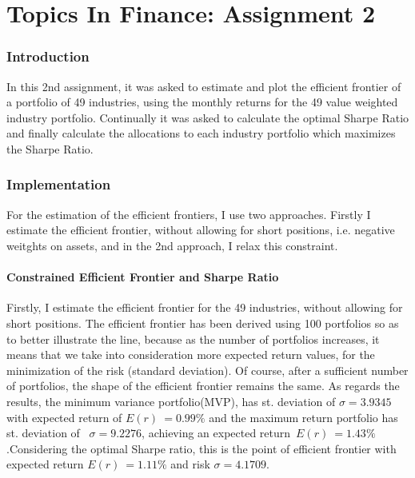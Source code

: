 \documentclass{article}
\begin{document}
\part{Topics In Finance: Assignment 2}

\bigskip

\section{Introduction}

In this 2nd assignment, it was asked to estimate and plot the efficient
frontier of a portfolio of 49 industries, using the monthly returns for the
49 value weighted industry portfolio. Continually it was asked to calculate
the optimal Sharpe Ratio and finally calculate the allocations to each
industry portfolio which maximizes the Sharpe Ratio.

\bigskip

\section{Implementation}

For the estimation of the efficient frontiers, I use two approaches. Firstly
I estimate the efficient frontier, without allowing for short positions,
i.e. negative weitghts on assets, and in the 2nd approach, I relax this
constraint.

\subsection{Constrained Efficient Frontier and Sharpe Ratio}

Firstly, I estimate the efficient frontier for the 49 industries, without
allowing for short positions. The efficient frontier has been derived using
100 portfolios so as to better illustrate the line, because as the number of
portfolios increases, it means that we take into consideration more expected
return values, for the minimization of the risk (standard deviation). Of
course, after a sufficient number of portfolios, the shape of the efficient
frontier remains the same. As regards the results, the minimum variance
portfolio(MVP), has st. deviation of $\sigma =3.9345$ with expected return
of $E(r)~=0.99\%$ and the maximum return portfolio has st. deviation of \  $%
\sigma =9.2276$, achieving an expected return\ $E(r)~=1.43\%$.Considering
the optimal Sharpe ratio, this is the point of efficient frontier with
expected return $E(r)~=1.11\%$ and risk $\sigma =4.1709$.
\end{document}

